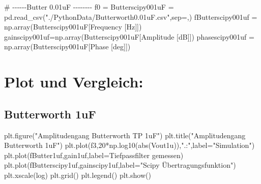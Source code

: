 \documentclass[
  ngerman,
  letterpaper,
  DIV=11]{scrreprt}
\newenvironment{Shaded}{}{}
\newcommand{\BuiltInTok}[1]{\textcolor[rgb]{0.84,0.23,0.29}{#1}}
\newcommand{\CommentTok}[1]{\textcolor[rgb]{0.42,0.45,0.49}{#1}}
\newcommand{\DecValTok}[1]{\textcolor[rgb]{0.00,0.36,0.77}{#1}}
\newcommand{\NormalTok}[1]{\textcolor[rgb]{0.14,0.16,0.18}{#1}}
\newcommand{\OperatorTok}[1]{\textcolor[rgb]{0.14,0.16,0.18}{#1}}
\newcommand{\StringTok}[1]{\textcolor[rgb]{0.01,0.18,0.38}{#1}}
\begin{document}
\begin{Shaded}
\begin{Highlighting}[]
\CommentTok{\# {-}{-}{-}{-}{-}{-}Butter 0.01uF {-}{-}{-}{-}{-}{-}{-}{-} f0 = }
\NormalTok{Butterscipy001uF }\OperatorTok{=}\NormalTok{ pd.read\_csv(}\StringTok{"./PythonData/Butterworth0.01uF.csv"}\NormalTok{,sep}\OperatorTok{=}\StringTok{\textquotesingle{},\textquotesingle{}}\NormalTok{)}
\NormalTok{fButterscipy001uf }\OperatorTok{=}\NormalTok{ np.array(Butterscipy001uF[}\StringTok{\textquotesingle{}Frequency [Hz]\textquotesingle{}}\NormalTok{])}
\NormalTok{gainscipy001uf}\OperatorTok{=}\NormalTok{np.array(Butterscipy001uF[}\StringTok{\textquotesingle{}Amplitude [dB]\textquotesingle{}}\NormalTok{])}
\NormalTok{phasescipy001uf }\OperatorTok{=}\NormalTok{ np.array(Butterscipy001uF[}\StringTok{\textquotesingle{}Phase [deg]\textquotesingle{}}\NormalTok{])}
\end{Highlighting}
\end{Shaded}

\section{Plot und Vergleich:}\label{plot-und-vergleich}

\subsection{Butterworth 1uF}\label{butterworth-1uf}

\begin{Shaded}
\begin{Highlighting}[]
\NormalTok{plt.figure(}\StringTok{"Amplitudengang Butterworth TP 1uF"}\NormalTok{)}
\NormalTok{plt.title(}\StringTok{"Amplitudengang Butterworth 1uF"}\NormalTok{)}
\NormalTok{plt.plot(f3,}\DecValTok{20}\OperatorTok{*}\NormalTok{np.log10(}\BuiltInTok{abs}\NormalTok{(Vout1u)),}\StringTok{".:"}\NormalTok{,label}\OperatorTok{=}\StringTok{"Simulation"}\NormalTok{)}
\NormalTok{plt.plot(fButter1uf,gain1uf,label}\OperatorTok{=}\StringTok{\textquotesingle{}Tiefpassfilter gemessen\textquotesingle{}}\NormalTok{)}
\NormalTok{plt.plot(fButterscipy1uf,gainscipy1uf,label}\OperatorTok{=}\StringTok{"Scipy Übertragungsfunktion"}\NormalTok{)}
\NormalTok{plt.xscale(}\StringTok{\textquotesingle{}log\textquotesingle{}}\NormalTok{)}
\NormalTok{plt.grid()}
\NormalTok{plt.legend()}
\NormalTok{plt.show()}
\end{Highlighting}
\end{Shaded}
\end{document}
